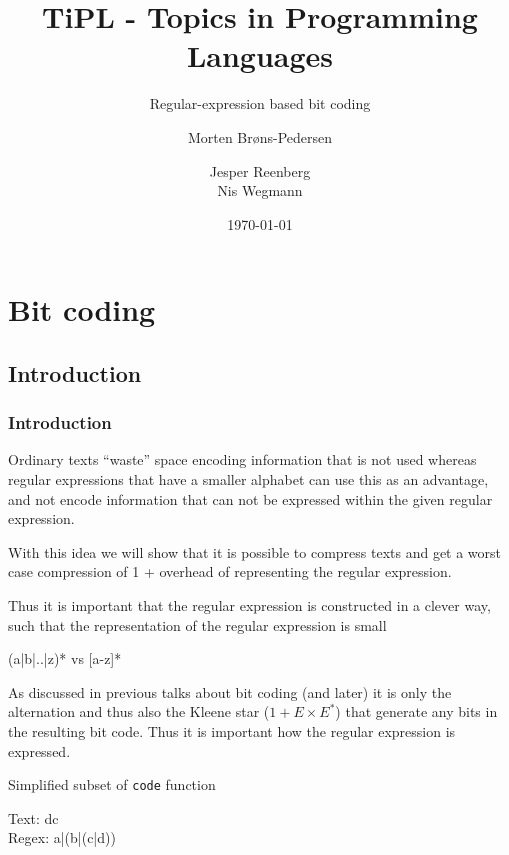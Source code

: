 \documentclass[slidestop,compress,mathserif, xcolor=table]{beamer}
\title[]{TiPL - Topics in Programming Languages}
\subtitle{Regular-expression based bit coding}
\author[Morten Brøns-Pedersen \and Jesper Reenberg \and Nis Wegmann]
       {Morten Brøns-Pedersen \and
        Jesper Reenberg  \\
        Nis Wegmann }
\institute[DIKU]{Department of Computer Science}
\date[]{\today}
\begin{document}
\frame[plain]{\titlepage}

\section{Bit coding}

\subsection{Introduction}

\begin{frame}
  \frametitle{Introduction}
  
  Ordinary texts ``waste'' space encoding information that is not used whereas
  regular expressions that have a smaller alphabet can use this as an advantage,
  and not encode information that can not be expressed within the given regular
  expression.

  With this idea we will show that it is possible to compress texts and get a
  worst case compression of 1 + overhead of representing the regular expression.

  Thus it is important that the regular expression is constructed in a clever
  way, such that the representation of the regular expression is small

  (a|b|..|z)* vs [a-z]* 

\end{frame}

\begin{frame}
  As discussed in previous talks about bit coding (and later) it is only the
  alternation and thus also the Kleene star ($1 + E \times E^*$) that generate
  any bits in the resulting bit code.  Thus it is important how the regular
  expression is expressed.

  \begin{block}{Simplified subset of \texttt{code} function}
\begin{semiverbatim}
\end{semiverbatim}
  \end{block}

  \begin{example}
    Text: dc\\
    Regex: a|(b|(c|d))
    
  \end{example}

\end{frame}
\end{document}
